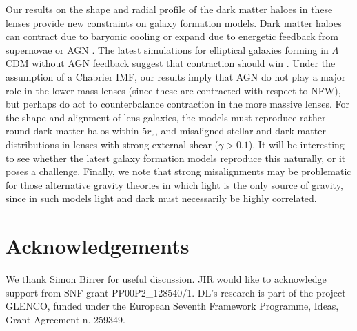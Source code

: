 \documentclass[useAMS,usenatbib]{mn2e}
\begin{document}
Our results on the shape and radial profile of the dark matter haloes in these lenses provide new constraints on galaxy formation models. Dark matter haloes can contract due to baryonic cooling \citep[e.g.][]{1986ApJ...301...27B} or expand due to energetic feedback from supernovae \citep[e.g.][]{2005MNRAS.356..107R} or AGN \citep[e.g.][]{2012MNRAS.422.3081M}. The latest simulations for elliptical galaxies forming in $\Lambda$CDM without AGN feedback suggest that contraction should win \citep{2015MNRAS.453.2447D}. Under the assumption of a Chabrier IMF, our results imply that AGN do not play a major role in the lower mass lenses (since these are contracted with respect to NFW), but perhaps do act to counterbalance contraction in the more massive lenses. For the shape and alignment of lens galaxies, the models must reproduce rather round dark matter halos within $5r_e$, and misaligned stellar and dark matter distributions in lenses with strong external shear ($\gamma > 0.1$). It will be interesting to see whether the latest galaxy formation models reproduce this naturally, or it poses a challenge. Finally, we note that strong misalignments may be problematic for those alternative gravity theories in which light is the only source of gravity, since in such models light and dark must necessarily be highly correlated.


\section{Acknowledgements}\label{sec:acknowledgements}
We thank Simon Birrer for useful discussion. JIR would like to acknowledge support from SNF grant PP00P2\_128540/1. DL's research is part of the project GLENCO, funded under the European Seventh Framework Programme, Ideas, Grant Agreement n. 259349.





\appendix
\end{document}
